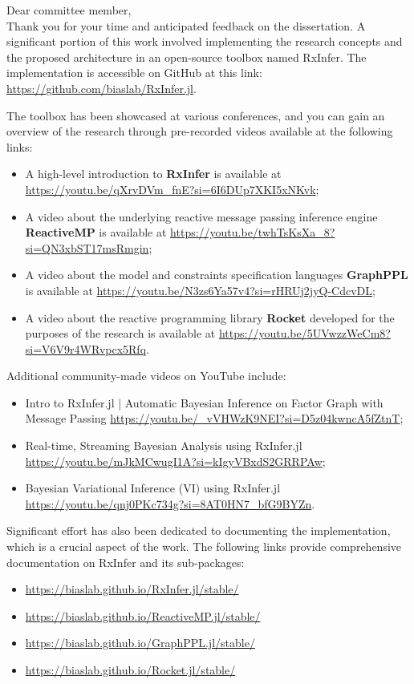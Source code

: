 \begin{tcolorbox}[title=Note to the committee]
    \small
    Dear committee member,\\
    Thank you for your time and anticipated feedback on the dissertation. A significant portion of this work involved implementing the research concepts and the proposed architecture in an open-source toolbox named RxInfer. The implementation is accessible on GitHub at this link: \url{https://github.com/biaslab/RxInfer.jl}. 
    
    The toolbox has been showcased at various conferences, and you can gain an overview of the research through pre-recorded videos available at the following links:
    \begin{itemize}
        \item A high-level introduction to \textbf{RxInfer} is available at \url{https://youtu.be/qXrvDVm_fnE?si=6I6DUp7XKI5xNKvk};
        \item A video about the underlying reactive message passing inference engine \textbf{ReactiveMP} is available at \url{https://youtu.be/twhTsKsXa_8?si=QN3xbST17msRmgin};
        \item A video about the model and constraints specification languages \textbf{GraphPPL} is available at \url{https://youtu.be/N3zs6Ya57v4?si=rHRUj2jyQ-CdcvDL};
        \item A video about the reactive programming library \textbf{Rocket} developed for the purposes of the research is available at \url{https://youtu.be/5UVwzzWeCm8?si=V6V9r4WRvpcx5Rfq}.
    \end{itemize}

    Additional community-made videos on YouTube include:
    \begin{itemize}
        \item Intro to RxInfer.jl | Automatic Bayesian Inference on Factor Graph with Message Passing \url{https://youtu.be/_vVHWzK9NEI?si=D5z04kwncA5fZtnT};
        \item Real-time, Streaming Bayesian Analysis using RxInfer.jl \url{https://youtu.be/mJkMCwugI1A?si=kIgyVBxdS2GRRPAw};
        \item Bayesian Variational Inference (VI) using RxInfer.jl \url{https://youtu.be/qnj0PKc734g?si=8AT0HN7_bfG9BYZn}.
    \end{itemize}
    
    Significant effort has also been dedicated to documenting the implementation, which is a crucial aspect of the work. The following links provide comprehensive documentation on RxInfer and its sub-packages:
    \begin{itemize}
        \item \url{https://biaslab.github.io/RxInfer.jl/stable/}
        \item \url{https://biaslab.github.io/ReactiveMP.jl/stable/}
        \item \url{https://biaslab.github.io/GraphPPL.jl/stable/}
        \item \url{https://biaslab.github.io/Rocket.jl/stable/}
    \end{itemize}


\end{tcolorbox}
